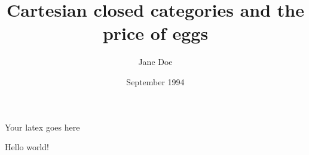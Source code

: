 Your latex goes here\documentclass{article}
\title{Cartesian closed categories and the price of eggs}
\author{Jane Doe}
\date{September 1994}
\begin{document}
   \maketitle
   Hello world!
\end{document}
